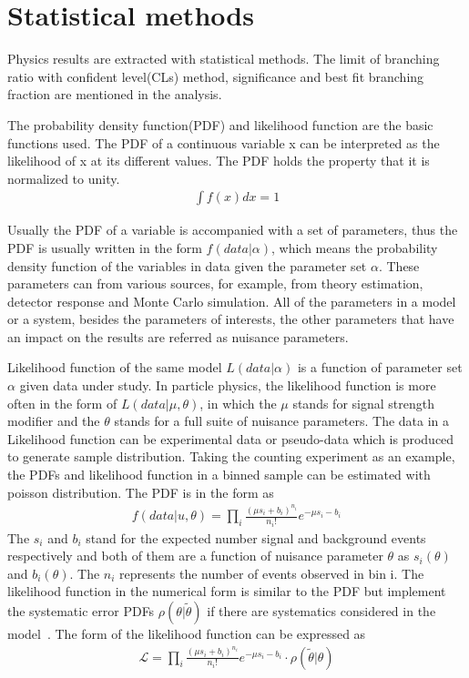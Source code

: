 \section{Statistical methods}

Physics results are extracted with statistical methods. The limit of branching ratio with confident level(CLs) method, significance and best fit branching fraction are mentioned in the analysis.  

The probability density function(PDF) and likelihood function are the basic functions used. The PDF of a continuous variable x can be interpreted as the likelihood of x at its different values. The PDF holds the property that it is normalized to unity. 
\begin{align*}
\int f(x) dx =1
\end{align*}

Usually the PDF of a variable is accompanied with a set of parameters, thus the PDF is usually written in the form $f(data|\alpha)$, which means the probability density function of the variables in data  given the parameter set $\alpha$. These parameters can from various sources, for example, from theory estimation, detector response and Monte Carlo simulation. All of the parameters in a model or a system, besides the parameters of interests, the other parameters that have an impact on the results are referred as nuisance parameters.       


Likelihood function of the same model $L(data|\alpha)$ is a function of parameter set $\alpha$ given data under study. In particle physics, the likelihood function is more often in the form of $L(data|\mu,\theta)$, in which the $\mu$ stands for signal strength modifier and the $\theta$ stands for a full suite of nuisance parameters. The data in a Likelihood function can be experimental data or pseudo-data which is produced to generate sample distribution. 
Taking the counting experiment as an example, the PDFs and likelihood function in a binned sample can be estimated with poisson distribution. The  PDF is in the form as
\begin{align*}
f(data|u,\theta)=\prod_{i}\frac{(\mu s_{i}+b_{i})^{n_{i}}}{n_{i}!}e^{-\mu s_{i}-b_{i}}
\end{align*}
The $s_{i}$ and $b_{i}$ stand for the expected number signal and background events respectively and both of them are a function of nuisance parameter $\theta$ as $s_{i}(\theta)$ and $b_{i}(\theta)$. The $n_{i}$ represents the number of events observed in bin i. The likelihood function in the numerical form is similar to the PDF but implement the systematic error PDFs $\rho(\theta|\tilde{\theta})$ if there are systematics considered in the model~\cite{CMS-NOTE-2011-005}. The form of the likelihood function can be expressed as 
\begin{align*}
\mathcal{L}=\prod_{i}\frac{(\mu s_{i}+b_{i})^{n_{i}}}{n_{i}!}e^{-\mu s_{i}-b_{i}}\cdot \rho(\tilde{\theta}|\theta)
\end{align*}

